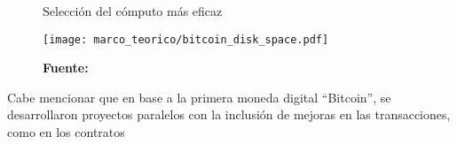 \documentclass[../main/main.tex]{subfiles}
\begin{document}
  \begin{figure}[ht]
    \centering
    \caption{Selección del cómputo más eficaz}
    \texttt{[image: marco\_teorico/bitcoin\_disk\_space.pdf]}
    \caption*{\textbf{Fuente:} \cite[p.~4]{article:satoshi_bitcoin}}
    \label{fig:bitcoin_disk_space}
  \end{figure}

  Cabe mencionar que en base a la primera moneda digital ``Bitcoin'', se desarrollaron proyectos paralelos con la inclusión de mejoras en las transacciones, como en los contratos
\end{document}
